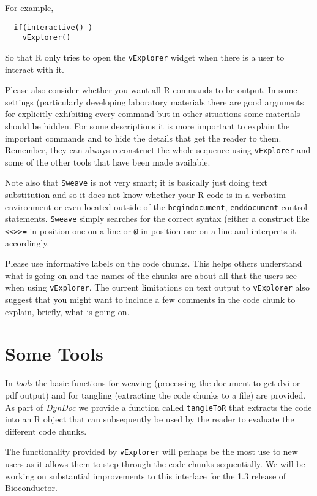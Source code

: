 \documentclass{article}
\newcommand{\Rfunction}[1]{{\texttt{#1}}}
\newcommand{\Rpackage}[1]{{\textit{#1}}}
\begin{document}
For example,
\begin{verbatim}
  if(interactive() )
    vExplorer()
\end{verbatim}

So that R only tries to open the \Rfunction{vExplorer} widget when
there is a user to interact with it.

Please also consider whether you want all R commands to be output. In
some settings (particularly developing laboratory materials there are
good arguments for explicitly exhibiting every command but in other
situations some materials should be hidden. For some descriptions it
is more important to explain the important commands and to hide the
details that get the reader to them. Remember, they can always
reconstruct the whole sequence using \Rfunction{vExplorer} and some of
the other tools that have been made available.

Note also that \Rfunction{Sweave} is not very smart; it is basically
just doing text substitution and so it does not know whether your R
code is in a verbatim environment or even located outside of the
\texttt{begin{document}}, \texttt{end{document}} control statements.
    \Rfunction{Sweave} simply searches for the correct syntax (either
    a construct like \verb+<<>>=+ in position one on a line or
    \verb+@+ in position one on a line and interprets it accordingly.

Please use informative labels on the code chunks. This helps others
understand what is going on and the names of the chunks are about all
that the users see when using \Rfunction{vExplorer}. The current
limitations on text output to \Rfunction{vExplorer} also suggest that
you might want to include a few comments in the code chunk to explain,
briefly, what is going on.

\section*{Some Tools}

In \Rpackage{tools} the basic functions for weaving (processing the
document to get dvi or pdf output) and for tangling (extracting the
code chunks to a file) are provided. As part of \Rpackage{DynDoc} we
provide a function called \Rfunction{tangleToR} that extracts the code 
into an R object that can subsequently be used by the reader to
evaluate the different code chunks.

The functionality provided by \Rfunction{vExplorer} will perhaps be
the most use to new users as it allows them to step through the code
chunks sequentially. We will be working on substantial improvements to
this interface for the 1.3 release of Bioconductor.
\end{document}
